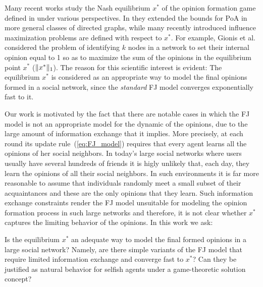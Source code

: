 Many recent works study the Nash equilibrium $x^*$ of the opinion formation
game defined in \cite{BKO11} under various perspectives. In \cite{CCL16} they
extended the bounds for PoA in more general classes of directed graphs, while
many recently introduced influence maximization problems
\cite{GTT13,AKPT18,MMT17} are defined with respect to $x^*$.  For example,
Gionis et al. \cite{GTT13} considered the problem of identifying $k$ nodes in a
network to set their internal opinion equal to 1 so as to maximize the sum of
the opinions in the equilibrium point $x^*$ ($\norm{1}{x^*}$).  The reason for
this scientific interest is evident: The equilibrium $x^*$ is considered as an
appropriate way to model the final opinions formed in a social network, since
the \emph{standard} FJ model converges exponentially fast to it.

Our work is motivated by the fact that there are notable cases in which the FJ
model is not an appropriate model for the dynamic of the opinions, due to the
large amount of information exchange that it implies.  More precisely, at each
round its update rule~(\ref{eq:FJ_model}) requires that every agent learns all
the opinions of her social neighbors.  In today's large social networks where
users usually have several hundreds of friends it is higly unlikely that, each
day, they learn the opinions of all their social neighbors.  In such
environments it is far more reasonable to assume that individuals randomly meet
a small subset of their acquaintances and these are the only opinions that they
learn. Such information exchange constraints render the FJ model unsuitable for
modeling the opinion formation process in such large networks and therefore, it
is not clear whether $x^*$ captures the limiting behavior of the opinions. In
this work we ask:
%
\begin{question}\label{q:motivation1}
  Is the equilibrium $x^*$ an adequate way to model the final formed opinions
  in a large social network? Namely, are there simple variants of the FJ model
  that require limited information exchange and converge fast to $x^*$? Can
  they be justified as natural behavior for selfish agents under a
  game-theoretic solution concept?
\end{question}

